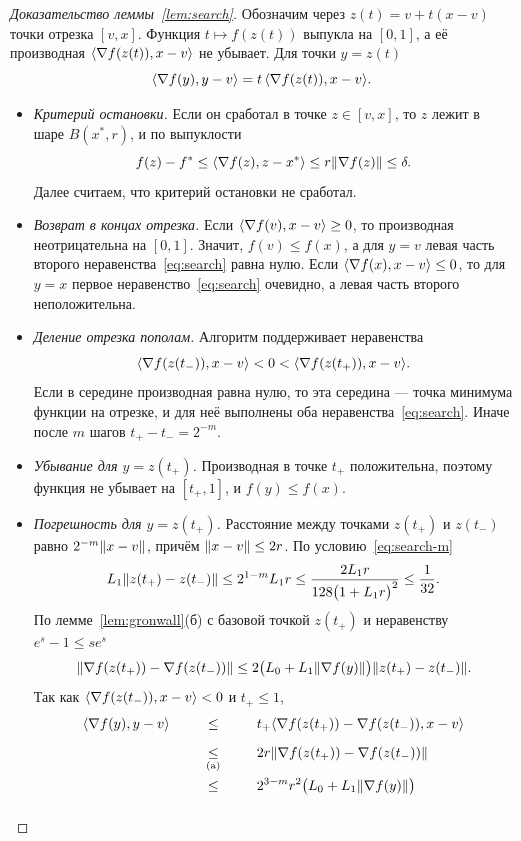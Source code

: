 \begin{proof}[Доказательство леммы~\ref{lem:search}]
Обозначим через $z(t)=v+t(x-v)$ точки отрезка $[v,x]$. Функция $t\mapsto f(z(t))$ выпукла на $[0,1]$, а её производная $\langle \nabla f(z(t)),x-v\rangle$ не убывает. Для точки $y=z(t)$
\[
 \langle \nabla f(y),y-v\rangle=t\,\langle \nabla f(z(t)),x-v\rangle .
\]
\begin{itemize}
\item \emph{Критерий остановки.} Если он сработал в точке $z\in[v,x]$, то $z$ лежит в шаре $B(x^\ast,r)$, и по выпуклости
\[
 f(z)-f^\ast\le\langle \nabla f(z),z-x^\ast\rangle\le r\|\nabla f(z)\|\le\delta .
\]
Далее считаем, что критерий остановки не сработал.
\item \emph{Возврат в концах отрезка.} Если $\langle \nabla f(v),x-v\rangle\ge0$, то производная неотрицательна на $[0,1]$. Значит, $f(v)\le f(x)$, а для $y=v$ левая часть второго неравенства~\eqref{eq:search} равна нулю. Если $\langle \nabla f(x),x-v\rangle\le0$, то для $y=x$ первое неравенство~\eqref{eq:search} очевидно, а левая часть второго неположительна.
\item \emph{Деление отрезка пополам.} Алгоритм поддерживает неравенства
\[
 \langle \nabla f(z(t_-)),x-v\rangle<0<\langle \nabla f(z(t_+)),x-v\rangle .
\]
Если в середине производная равна нулю, то эта середина --- точка минимума функции на отрезке, и для неё выполнены оба неравенства~\eqref{eq:search}. Иначе после $m$ шагов $t_+-t_-=2^{-m}$.
\item \emph{Убывание для $y=z(t_+)$.} Производная в точке $t_+$ положительна, поэтому функция не убывает на $[t_+,1]$, и $f(y)\le f(x)$.
\item \emph{Погрешность для $y=z(t_+)$.} Расстояние между точками $z(t_+)$ и $z(t_-)$ равно $2^{-m}\|x-v\|$, причём $\|x-v\|\le2r$. По условию~\eqref{eq:search-m}
\[
 L_1\|z(t_+)-z(t_-)\|\le2^{1-m}L_1r\le\frac{2L_1r}{128\bigl(1+L_1r\bigr)^2}\le\frac1{32} .
\]
По лемме~\ref{lem:gronwall}(б) с базовой точкой $z(t_+)$ и неравенству $e^s-1\le se^s$
\[
 \|\nabla f(z(t_+))-\nabla f(z(t_-))\|\le2\bigl(L_0+L_1\|\nabla f(y)\|\bigr)\|z(t_+)-z(t_-)\| .
\]
Так как $\langle \nabla f(z(t_-)),x-v\rangle<0$ и $t_+\le1$,
\begin{align*}
 \ip{\nabla f(y)}{y-v}
 &\bypad{\le}{}{\eqref{eq:search-m}}t_+\ip{\nabla f(z(t_+))-\nabla f(z(t_-))}{x-v}\\
 &\bypad{\le}{(\mathrm a)}{\eqref{eq:search-m}}2r\norm{\nabla f(z(t_+))-\nabla f(z(t_-))}\\
 &\bypad{\le}{}{\eqref{eq:search-m}}2^{3-m}r^2\bigl(L_0+L_1\norm{\nabla f(y)}\bigr)\\

\end{align*}
\end{itemize}
\end{proof}

